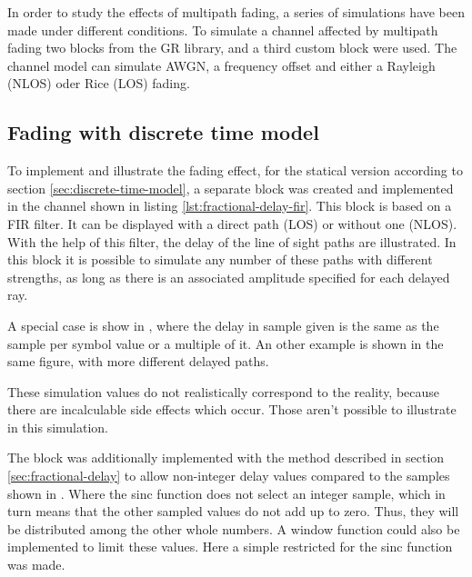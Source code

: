 In order to study the effects of multipath fading, a series of simulations have been made under different conditions. To simulate a channel affected by multipath fading two blocks from the GR library, and a third custom block were used. The channel model can simulate AWGN, a frequency offset and either a Rayleigh (NLOS) oder Rice (LOS) fading.

\subsection{Fading with discrete time model} \label{sec:discrete-time-model-fir}

 To implement and illustrate the fading effect, for the statical version according to section \ref{sec:discrete-time-model}, a separate block was created and implemented in the channel shown in listing \ref{lst:fractional-delay-fir}. This block is based on a FIR filter. It can be displayed with a direct path (LOS) or without one (NLOS).
With the help of this filter, the delay of the line of sight paths are illustrated. In this block it is possible to simulate any number of these paths with different strengths, as long as there is an associated amplitude specified for each delayed ray. 

A special case is show in , where the delay in sample given is the same as the sample per symbol value or a multiple of it. An other example is shown in the same figure, with more different delayed paths.

 These simulation values do not realistically correspond to the reality, because there are incalculable side effects which occur. Those aren't possible to illustrate in this simulation.

The block was additionally implemented with the method described in section \ref{sec:fractional-delay} to allow non-integer delay values compared to the samples shown in . Where the sinc function does not select an integer sample, which in turn means that the other sampled values do not add up to zero.
Thus, they will be distributed among the other whole numbers. A window function could also be implemented to limit these values. Here  a simple restricted for the sinc function was made.


